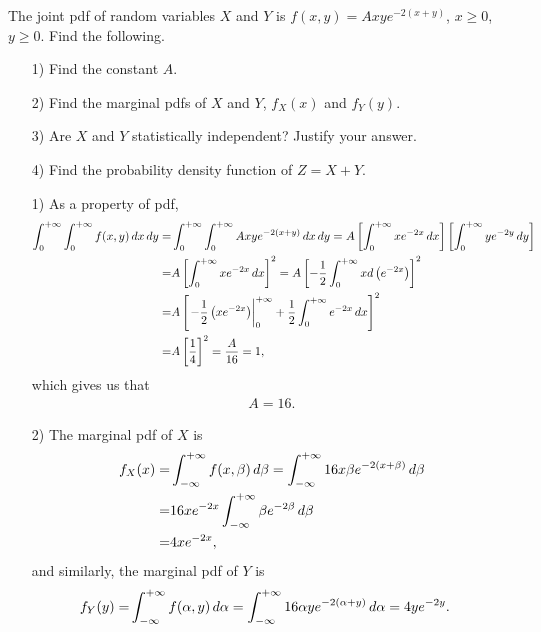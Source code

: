 \documentclass{assignment}
\begin{document}
\begin{prob}
    The joint pdf of random variables $X$ and $Y$ is $f(x,y)=Axye^{-2(x+y)}$, $x\geq 0$, $y\geq 0$. Find the following.
    \begin{itemize}
        \item[1)] Find the constant $A$.
        \item[2)] Find the marginal pdfs of $X$ and $Y$, $f_X(x)$ and $f_Y(y)$.
        \item[3)] Are $X$ and $Y$ statistically independent? Justify your answer.
        \item[4)] Find the probability density function of $Z=X+Y$.
    \end{itemize}
\end{prob}
\begin{sol}
    \begin{itemize}
        \item[1)] As a property of pdf,
        \begin{align}
            \notag\int_0^{+\infty}\int_0^{+\infty}f(x,y)\,dx\,dy=&\int_0^{+\infty}\int_0^{+\infty}Axye^{-2(x+y)}\,dx\,dy=A\left[\int_0^{+\infty}xe^{-2x}\,dx\right]\left[\int_0^{+\infty}ye^{-2y}\,dy\right]\\
            \notag=&A\left[\int_0^{+\infty}xe^{-2x}\,dx\right]^2=A\left[-\frac{1}{2}\int_0^{+\infty}xd\left(e^{-2x}\right)\right]^2\\
            \notag=&A\left[\left.-\frac{1}{2}\left(xe^{-2x}\right)\right\rvert_0^{+\infty}+\frac{1}{2}\int_0^{+\infty}e^{-2x}\,dx\right]^2\\
            \notag=&A\left[\frac{1}{4}\right]^2=\frac{A}{16}=1,
        \end{align}
        which gives us that
        \begin{align}
            A=16.
        \end{align}
        \item[2)] The marginal pdf of $X$ is
        \begin{align}
            \notag f_X(x)=&\int_{-\infty}^{+\infty}f(x,\beta)\,d\beta=\int_{-\infty}^{+\infty}16x\beta e^{-2(x+\beta)}\,d\beta\\
            \notag=&16xe^{-2x}\int_{-\infty}^{+\infty}\beta e^{-2\beta}\,d\beta\\
            =&4xe^{-2x},
        \end{align}
        and similarly, the marginal pdf of $Y$ is
        \begin{align}
            \notag f_Y(y)=&\int_{-\infty}^{+\infty}f(\alpha,y)\,d\alpha=\int_{-\infty}^{+\infty}16\alpha ye^{-2(\alpha+y)}\,d\alpha=4ye^{-2y}.

\end{align}
\end{itemize}
\end{sol}
\end{document}
